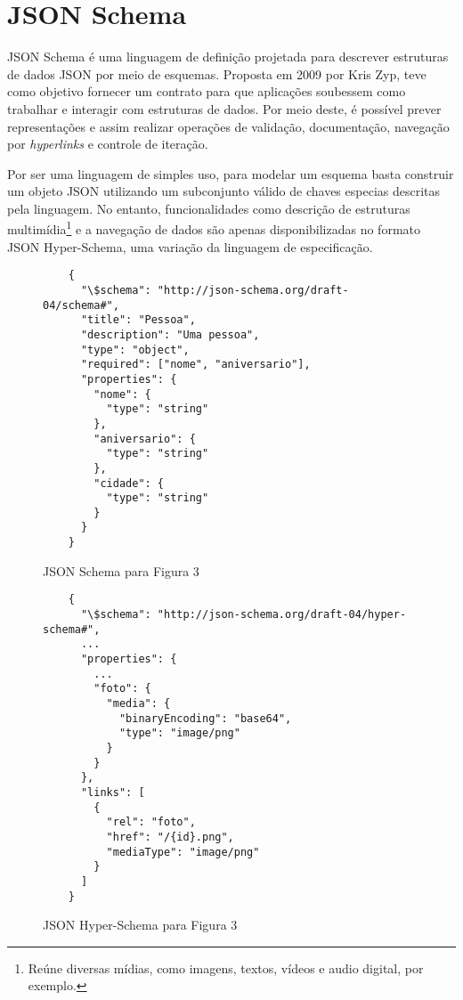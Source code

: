 \section[JSON Schema]{JSON Schema}

JSON Schema é uma linguagem de definição projetada para descrever estruturas de dados JSON por meio de esquemas. Proposta em 2009 por Kris Zyp, teve como objetivo fornecer um contrato para que aplicações soubessem como trabalhar e interagir com estruturas de dados. Por meio deste, é possível prever representações e assim realizar operações de validação, documentação, navegação por \textit{hyperlinks} e controle de iteração.

Por ser uma linguagem de simples uso, para modelar um esquema basta construir um objeto JSON utilizando um subconjunto válido de chaves especias descritas pela linguagem. No entanto, funcionalidades como descrição de estruturas multimídia\footnote{
 Reúne diversas mídias, como imagens, textos, vídeos e audio digital, por exemplo.
} e a navegação de dados são apenas disponibilizadas no formato JSON Hyper-Schema, uma variação da linguagem de especificação. \cite{Jackson2016}

\begin{figure}[H]
  \centering
  \begin{verbatim}
    {
      "\$schema": "http://json-schema.org/draft-04/schema#",
      "title": "Pessoa",
      "description": "Uma pessoa",
      "type": "object",
      "required": ["nome", "aniversario"],
      "properties": {
        "nome": {
          "type": "string"
        },
        "aniversario": {
          "type": "string"
        },
        "cidade": {
          "type": "string"
        }
      }
    }
  \end{verbatim}
  \caption{JSON Schema para Figura 3}
\end{figure}

\begin{figure}[H]
  \centering
  \begin{verbatim}
    {
      "\$schema": "http://json-schema.org/draft-04/hyper-schema#",
      ...
      "properties": {
        ...
        "foto": {
          "media": {
            "binaryEncoding": "base64",
            "type": "image/png"
          }
        }
      },
      "links": [
        {
          "rel": "foto",
          "href": "/{id}.png",
          "mediaType": "image/png"
        }
      ]
    }
  \end{verbatim}
  \caption{JSON Hyper-Schema para Figura 3}
\end{figure}

